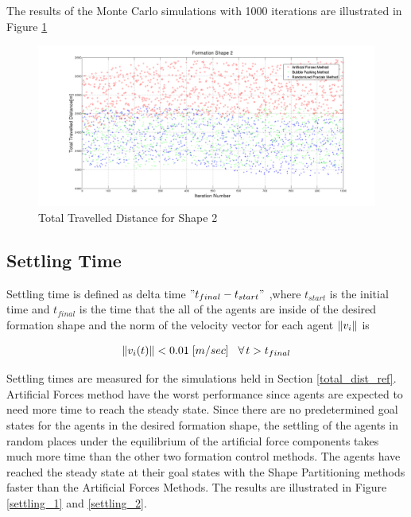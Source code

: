 The results of the Monte Carlo simulations with 1000 iterations are illustrated in Figure \ref{total_dist_2}

\begin{figure}[H]
\caption{Total Travelled Distance for Shape 2} \label{total_dist_2}
\centerline{\includegraphics[scale = 0.32]{Total_Energy_Shape_2}} 
\end{figure} 	
		   
\subsection{Settling Time} \label{settling_ref}
Settling time is defined as delta time $"t_{final} - t_{start}"$ ,where $t_{start}$ is the initial time and $t_{final}$ is the time that the all of the agents are inside of the desired formation shape and the norm of the velocity vector for each agent $\left\lVert v_i\right\rVert$ is
		
\begin{equation}
\left\lVert v_i(t)\right\rVert < 0.01 \hspace{0.1cm} [m/sec] \hspace{0.3cm}\forall\hspace{0.05cm} t>t_{final}
\end{equation}
		
Settling times are measured for the simulations held in Section \ref{total_dist_ref}. Artificial Forces method have the worst performance since agents are expected to need more time to reach the steady state. Since there are no predetermined goal states for the agents in the desired formation shape, the settling of the agents in random places under the equilibrium of the artificial force components takes much more time than the other two formation control methods. The agents have reached the steady state at their goal states with the Shape Partitioning methods faster than the Artificial Forces Methods. The results are illustrated in Figure \ref{settling_1} and \ref{settling_2}.
		
